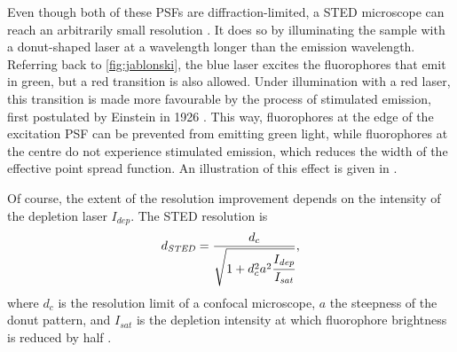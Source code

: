 Even though both of these PSFs are diffraction-limited, a STED microscope can reach an arbitrarily small resolution \cite{Wildanger2012}. It does so by illuminating the sample with a donut-shaped laser at a wavelength longer than the emission wavelength. Referring back to \autoref{fig:jablonski}, the blue laser excites the fluorophores that emit in green, but a red transition is also allowed. Under illumination with a red laser, this transition is made more favourable by the process of stimulated emission, first postulated by Einstein in 1926 \cite{Einstein1926}. This way, fluorophores at the edge of the excitation PSF can be prevented from emitting green light, while fluorophores at the centre do not experience stimulated emission, which reduces the width of the effective point spread function. An illustration of this effect is given in .

Of course, the extent of the resolution improvement depends on the intensity of the depletion laser $ I_\mathit{dep}$. The STED resolution is
\begin{equation}
	d_\mathit{STED} = \frac{d_c}{\sqrt{1+d_c^2a^2\cfrac{I_\mathit{dep}}{I_\mathit{sat}}}},
\end{equation}
where $ d_c $ is the resolution limit of a confocal microscope, $ a $ the steepness of the donut pattern, and $ I_\mathit{sat} $ is the depletion intensity at which fluorophore brightness is reduced by half \cite{Harke2008}.
